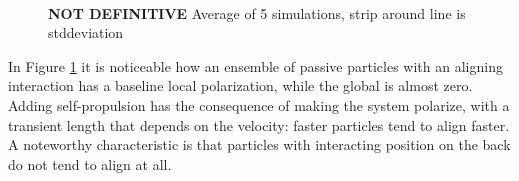 \documentclass[../../master_thesis_np.tex]{subfiles}
\begin{document}
		\begin{figure}[htp]
			\centering
			\\
			
			\caption{\textbf{NOT DEFINITIVE}  Average of 5 simulations, strip around line is stddeviation}
			\label{fig:lj_velocity_pol}
		\end{figure}
		
		In Figure \ref{fig:lj_velocity_pol} it is noticeable how an ensemble of passive particles with an aligning interaction has a baseline local polarization, while the global is almost zero. Adding self-propulsion has the consequence of making the system polarize, with a transient length that depends on the velocity: faster particles tend to align faster. A noteworthy characteristic is that particles with interacting position on the back do not tend to align at all.
		
\end{document}
